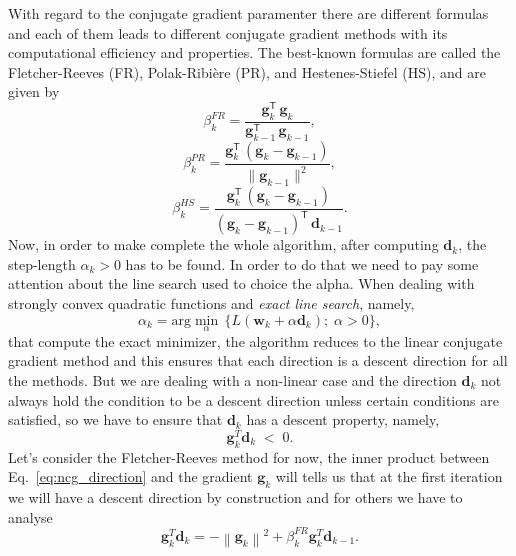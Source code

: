\documentclass[11pt]{article}
\newcommand{\norm}[1]{\left\lVert#1\right\rVert}
\begin{document}
With regard to the conjugate gradient paramenter there are different formulas and each of them leads to different conjugate gradient methods with its computational efficiency and properties. The best-known formulas are called the Fletcher-Reeves (FR), Polak-Ribière (PR), and Hestenes-Stiefel (HS), and are given by 
\begin{equation}
  \beta_k^{FR} = \frac{\mathbf{g}_k^\mathsf{T} \, \mathbf{g}_k}{\mathbf{g}_{k-1}^\mathsf{T} \, \mathbf{g}_{k-1}},  
\end{equation}
\begin{equation}
  \beta_k^{PR} = \frac{\mathbf{g}_k^\mathsf{T} \, (\mathbf{g}_k - \mathbf{g}_{k-1})}{\|\mathbf{g}_{k-1}\|^2},  
\end{equation}
\begin{equation}
  \beta_k^{HS} = \frac{\mathbf{g}_k^\mathsf{T} \, (\mathbf{g}_k - \mathbf{g}_{k-1})}{(\mathbf{g}_k - \mathbf{g}_{k-1})^\mathsf{T} \, \mathbf{d}_{k-1}}.  
\end{equation}
Now, in order to make complete the whole algorithm, after computing $\mathbf{d}_k$, the step-length $\alpha_k > 0$ has to be found. In order to do that we need to pay some attention about the line search used to choice the alpha. When dealing with strongly convex quadratic functions and \emph{exact line search}, namely,
\begin{equation}
    \label{eq:exact_linesearch}
    \alpha_k = \text{arg}\min\limits_{\alpha} \,\{ L(\mathbf{w}_k + \alpha \mathbf{d}_k); \; \alpha > 0 \},
\end{equation}
that compute the exact minimizer, the algorithm reduces to the linear conjugate gradient method and this ensures that each direction is a descent direction \cite{Nocedal} for all the methods. But we are dealing with a non-linear case and the direction $\mathbf{d}_k$ not always hold the condition to be a descent direction unless certain conditions are satisfied, so we have to ensure that $\mathbf{d}_k$ has a descent property, namely, 
\begin{equation}
    \mathbf{g}_k^T \mathbf{d}_k \;< \;0.
\end{equation}
Let's consider the Fletcher-Reeves method for now, the inner product between Eq.~\ref{eq:ncg_direction} and the gradient $\mathbf{g}_k$ will tells us that at the first iteration we will have a descent direction by construction and for others we have to analyse
\begin{equation}
\label{eq:descent_dir_property}
    \mathbf{g}_k^T\mathbf{d}_k = - \norm{\mathbf{g}_k}^2 + \beta^{FR}_k\mathbf{g}^T_k \mathbf{d}_{k-1}.
\end{equation}
\end{document}

